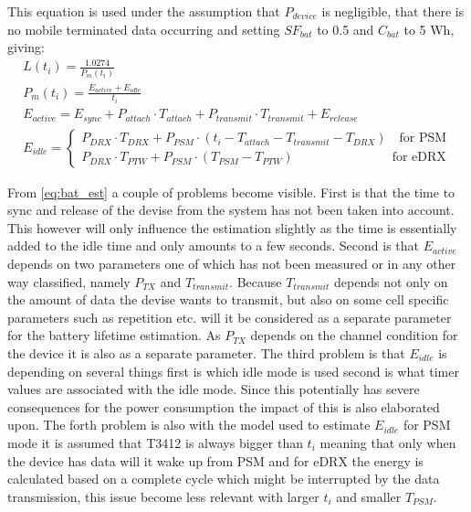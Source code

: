 This equation is used under the assumption that $P_{device}$ is negligible, that there is no mobile terminated data occurring and setting $SF_{bat}$ to 0.5 and $C_{bat}$ to 5 Wh, giving:
\begin{equation}\label{eq:bat_est}
\begin{gathered}
	L(t_i) = \frac{1.0274}{P_m(t_i)} \\
	P_m(t_i) = \frac{E_{active} + E_{idle}}{t_i} \\
	E_{active} = E_{sync} + P_{attach}\cdot T_{attach} + P_{transmit}\cdot T_{transmit} + E_{release} \\
	E_{idle} = \begin{cases} P_{DRX}\cdot T_{DRX} + P_{PSM}\cdot (t_i - T_{attach} - T_{transmit} - T_{DRX}) \quad \text{for PSM}\\
							P_{DRX}\cdot T_{PTW} + P_{PSM} \cdot (T_{PSM} - T_{PTW}) \qquad\qquad\qquad\quad\;\;\, \text{for eDRX}
				\end{cases}
\end{gathered}
\end{equation}

From \autoref{eq:bat_est} a couple of problems become visible. First is that the time to sync and release of the devise from the system has not been taken into account. This however will only influence the estimation slightly as the time is essentially added to the idle time and only amounts to a few seconds. Second is that $E_{active}$ depends on two parameters one of which has not been measured or in any other way classified, namely $P_{TX}$ and $T_{transmit}$. Because $T_{transmit}$ depends not only on the amount of data the devise wants to transmit, but also on some cell specific parameters such as repetition etc. will it be considered as a separate parameter for the battery lifetime estimation. As $P_{TX}$ depends on the channel condition for the device it is also as a separate parameter. The third problem is that $E_{idle}$ is depending on several things first is which idle mode is used second is what timer values are associated with the idle mode. Since this potentially has severe consequences for the power consumption the impact of this is also elaborated upon. The forth problem is also with the model used to estimate $E_{idle}$ for PSM mode it is assumed that T3412 is always bigger than $t_i$ meaning that only when the device has data will it wake up from PSM and for eDRX the energy is calculated based on a complete cycle which might be interrupted by the data transmission, this issue become less relevant with larger $t_i$ and smaller $T_{PSM}$. 

